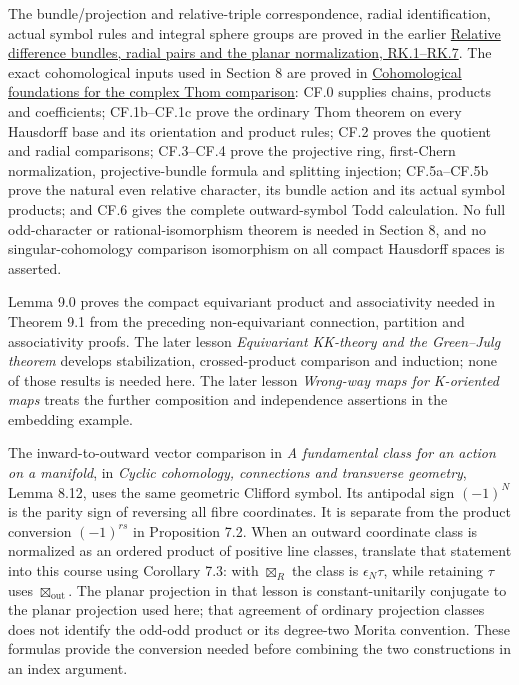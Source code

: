 \documentclass[
  11pt,
]{article}
\begin{document}
The bundle/projection and relative-triple correspondence, radial
identification, actual symbol rules and integral sphere groups are
proved in the earlier
\href{supporting/relative-k-foundations/relative-k-foundations.html\#rk-bundle-projection}{Relative
difference bundles, radial pairs and the planar normalization,
RK.1--RK.7}. The exact cohomological inputs used in Section 8 are proved
in
\href{supporting/cohomological-foundations/cohomological-foundations.html\#cf-thom}{Cohomological
foundations for the complex Thom comparison}: CF.0 supplies chains,
products and coefficients; CF.1b--CF.1c prove the ordinary Thom theorem
on every Hausdorff base and its orientation and product rules; CF.2
proves the quotient and radial comparisons; CF.3--CF.4 prove the
projective ring, first-Chern normalization, projective-bundle formula
and splitting injection; CF.5a--CF.5b prove the natural even relative
character, its bundle action and its actual symbol products; and CF.6
gives the complete outward-symbol Todd calculation. No full
odd-character or rational-isomorphism theorem is needed in Section 8,
and no singular-cohomology comparison isomorphism on all compact
Hausdorff spaces is asserted.

Lemma 9.0 proves the compact equivariant product and associativity
needed in Theorem 9.1 from the preceding non-equivariant connection,
partition and associativity proofs. The later lesson \emph{Equivariant
KK-theory and the Green--Julg theorem} develops stabilization,
crossed-product comparison and induction; none of those results is
needed here. The later lesson \emph{Wrong-way maps for K-oriented maps}
treats the further composition and independence assertions in the
embedding example.

The inward-to-outward vector comparison in \emph{A fundamental class for
an action on a manifold}, in \emph{Cyclic cohomology, connections and
transverse geometry}, Lemma 8.12, uses the same geometric Clifford
symbol. Its antipodal sign \((-1)^N\) is the parity sign of reversing
all fibre coordinates. It is separate from the product conversion
\((-1)^{rs}\) in Proposition 7.2. When an outward coordinate class is
normalized as an ordered product of positive line classes, translate
that statement into this course using Corollary 7.3: with
\(\boxtimes_R\) the class is \(\epsilon_N\tau\), while retaining
\(\tau\) uses \(\boxtimes_{\mathrm{out}}\). The planar projection in
that lesson is constant-unitarily conjugate to the planar projection
used here; that agreement of ordinary projection classes does not
identify the odd-odd product or its degree-two Morita convention. These
formulas provide the conversion needed before combining the two
constructions in an index argument.
\end{document}
